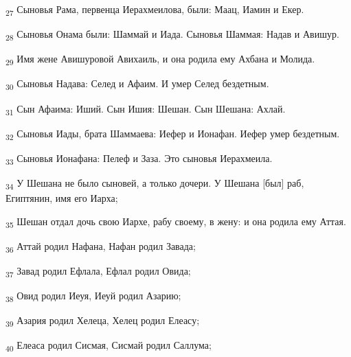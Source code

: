 \begin{tcolorbox}
\textsubscript{27} Сыновья Рама, первенца Иерахмеилова, были: Маац, Иамин и Екер.
\end{tcolorbox}
\begin{tcolorbox}
\textsubscript{28} Сыновья Онама были: Шаммай и Иада. Сыновья Шаммая: Надав и Авишур.
\end{tcolorbox}
\begin{tcolorbox}
\textsubscript{29} Имя жене Авишуровой Авихаиль, и она родила ему Ахбана и Молида.
\end{tcolorbox}
\begin{tcolorbox}
\textsubscript{30} Сыновья Надава: Селед и Афаим. И умер Селед бездетным.
\end{tcolorbox}
\begin{tcolorbox}
\textsubscript{31} Сын Афаима: Иший. Сын Ишия: Шешан. Сын Шешана: Ахлай.
\end{tcolorbox}
\begin{tcolorbox}
\textsubscript{32} Сыновья Иады, брата Шаммаева: Иефер и Ионафан. Иефер умер бездетным.
\end{tcolorbox}
\begin{tcolorbox}
\textsubscript{33} Сыновья Ионафана: Пелеф и Заза. Это сыновья Иерахмеила.
\end{tcolorbox}
\begin{tcolorbox}
\textsubscript{34} У Шешана не было сыновей, а только дочери. У Шешана [был] раб, Египтянин, имя его Иарха;
\end{tcolorbox}
\begin{tcolorbox}
\textsubscript{35} Шешан отдал дочь свою Иархе, рабу своему, в жену: и она родила ему Аттая.
\end{tcolorbox}
\begin{tcolorbox}
\textsubscript{36} Аттай родил Нафана, Нафан родил Завада;
\end{tcolorbox}
\begin{tcolorbox}
\textsubscript{37} Завад родил Ефлала, Ефлал родил Овида;
\end{tcolorbox}
\begin{tcolorbox}
\textsubscript{38} Овид родил Иеуя, Иеуй родил Азарию;
\end{tcolorbox}
\begin{tcolorbox}
\textsubscript{39} Азария родил Хелеца, Хелец родил Елеасу;
\end{tcolorbox}
\begin{tcolorbox}
\textsubscript{40} Елеаса родил Сисмая, Сисмай родил Саллума;
\end{tcolorbox}

